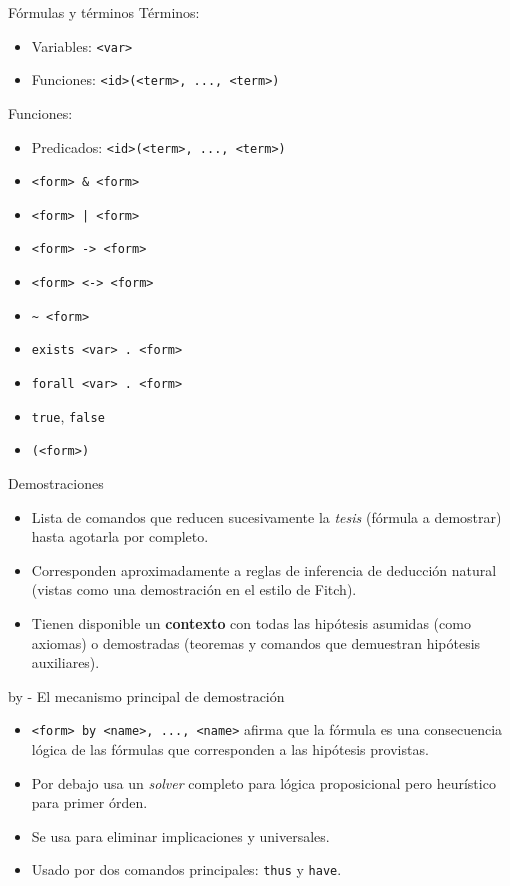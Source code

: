 \documentclass[xcolor={dvipsnames},spanish]{beamer}
\begin{document}
\begin{frame}[fragile]{Fórmulas y términos}
    Términos:
    \begin{itemize}
        \item Variables: \lstinline{<var>}
        \item Funciones: \lstinline{<id>(<term>, ..., <term>)}
    \end{itemize}

    Funciones:
    \begin{itemize}
        \item Predicados: \lstinline{<id>(<term>, ..., <term>)}
        \item \lstinline{<form> & <form>}
        \item \lstinline{<form> | <form>}
        \item \lstinline{<form> -> <form>}
        \item \lstinline{<form> <-> <form>}
        \item \lstinline{~ <form>}
        \item \lstinline{exists <var> . <form>}
        \item \lstinline{forall <var> . <form>}
        \item \lstinline{true}, \lstinline{false}
        \item \lstinline{(<form>)}
    \end{itemize}
\end{frame}

\begin{frame}{Demostraciones}
    \begin{itemize}
        \item Lista de comandos que reducen sucesivamente la \textit{tesis}
        (fórmula a demostrar) hasta agotarla por completo.
        \item Corresponden aproximadamente a reglas de inferencia de deducción
        natural (vistas como una demostración en el estilo de Fitch).
        \item Tienen disponible un \textbf{contexto} con todas las hipótesis
        asumidas (como axiomas) o demostradas (teoremas y comandos que
        demuestran hipótesis auxiliares).
    \end{itemize}
\end{frame}

\begin{frame}{by - El mecanismo principal de demostración}
    \begin{itemize}
        \item \lstinline{<form> by <name>, ..., <name>} afirma que la fórmula es una consecuencia lógica de las fórmulas que corresponden a las hipótesis provistas.
        \item Por debajo usa un \textit{solver} completo para lógica proposicional pero heurístico para primer órden.
        \item Se usa para eliminar implicaciones y universales.
        \item Usado por dos comandos principales: \lstinline{thus} y \lstinline{have}.
    \end{itemize}
\end{frame}
\end{document}
